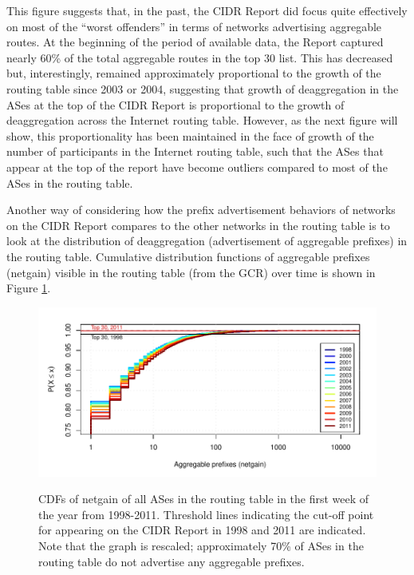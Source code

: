 This figure suggests that, in the past, the CIDR Report did focus quite
effectively on most of the ``worst offenders'' in terms of networks advertising
aggregable routes. At the beginning of the period of available data, the Report
captured nearly 60\% of the total aggregable routes in the top 30 list. This
has decreased but, interestingly, remained approximately proportional to the
growth of the routing table since 2003 or 2004, suggesting that growth of
deaggregation in the ASes at the top of the CIDR Report is proportional to the
growth of deaggregation across the Internet routing table. However, as the next
figure will show, this proportionality has been maintained in the face of
growth of the number of participants in the Internet routing table, such that
the ASes that appear at the top of the report have become outliers compared to
most of the ASes in the routing table.

Another way of considering how the prefix advertisement behaviors of networks
on the CIDR Report compares to the other networks in the routing table is to
look at the distribution of deaggregation (advertisement of aggregable
prefixes) in the routing table. Cumulative distribution functions of aggregable
prefixes (netgain) visible in the routing table (from the GCR) over time is
shown in Figure \ref{fig:netgain_cdf}.

\begin{figure}[h!]
\begin{centering}
\begin{singlespace}
    \includegraphics[width=6in]{figures/netgain_cdf_gcr.pdf}
    \vspace{-2em}\\
    \caption[CDFs of netgain of all ASes in the routing table in the first week
    of the year from 1998-2011]{CDFs of netgain of all ASes in the routing
    table in the first week of the year from 1998-2011. Threshold lines
    indicating the cut-off point for appearing on the CIDR Report in 1998 and
    2011 are indicated. Note that the graph is rescaled; approximately 70\% of
    ASes in the routing table do not advertise any aggregable prefixes.}
    \label{fig:netgain_cdf}
\end{singlespace}
\end{centering}
\end{figure}

